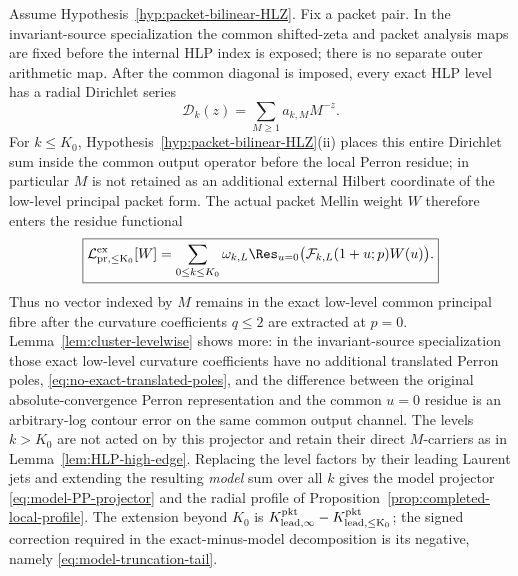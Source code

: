 \begin{lemma}
\label{lem:internal-principal-contraction}
Assume Hypothesis~\ref{hyp:packet-bilinear-HLZ}. Fix a packet pair. In the
invariant-source specialization the common shifted-zeta and packet analysis
maps are fixed before the internal HLP index is exposed; there is no separate
outer arithmetic map. After the common diagonal is imposed, every exact HLP
level has a radial Dirichlet series
\[
\mathcal D_k(z)=\sum_{M\ge1}a_{k,M}M^{-z}.
\]
For $k\le K_0$, Hypothesis~\ref{hyp:packet-bilinear-HLZ}(ii) places this entire
Dirichlet sum inside the common output operator before the local Perron
residue; in particular $M$ is not retained as an additional external Hilbert
coordinate of the low-level principal packet form. The actual packet Mellin
weight $W$ therefore enters the residue functional
\begin{equation}
\boxed{
\mathcal L_{\rm pr,\le K_0}^{\rm ex}[W]
=\sum_{0\le k\le K_0}\omega_{k,L}
\Res_{u=0}\bigl(\mathcal F_{k,L}(1+u;p)W(u)\bigr).
}
\label{eq:internal-principal-functional}
\end{equation}
Thus no vector indexed by $M$ remains in the exact low-level common principal
fibre after the curvature coefficients $q\le2$ are extracted at $p=0$.
Lemma~\ref{lem:cluster-levelwise} shows more: in the invariant-source
specialization those exact low-level curvature coefficients have no additional
translated Perron poles, \eqref{eq:no-exact-translated-poles}, and the difference between the original
absolute-convergence Perron representation and the common $u=0$ residue is an
arbitrary-log contour error on the same common output channel.  The levels
$k>K_0$ are not acted on by this projector and retain their direct $M$-carriers
as in Lemma~\ref{lem:HLP-high-edge}. Replacing the level factors by
their leading Laurent jets and extending the resulting \emph{model} sum over
all $k$ gives the model projector \eqref{eq:model-PP-projector} and the radial
profile of Proposition~\ref{prop:completed-local-profile}. The extension beyond
$K_0$ is $K_{\rm lead,\infty}^{\rm pkt}-K_{\rm lead,\le K_0}^{\rm pkt}$; the
signed correction required in the exact-minus-model decomposition is its
negative, namely \eqref{eq:model-truncation-tail}.
\end{lemma}

